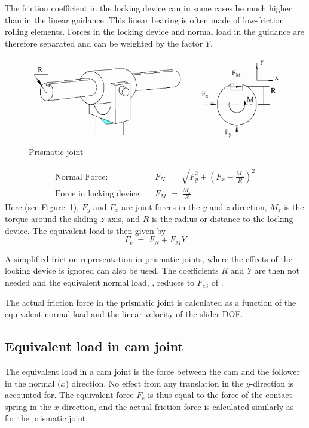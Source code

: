 The friction coefficient in the locking device can in some cases be much higher
than in the linear guidance. This linear bearing is often made of low-friction
rolling elements. Forces in the locking device and normal load in the guidance
are therefore separated and can be weighted by the factor $Y$.
%
\begin{figure}[b]
\includegraphics[width=\textwidth]{Figures/FricPriJoint.png}
\caption{Prismatic joint}
\label{figFRIC:Prism}
\end{figure}
%
\begin{eqnarray}
\text{Normal Force:} && F_N \;=\; \sqrt{F_y^2 + (F_x - \frac{M_z}{R})^2} \\
\text{Force in locking device:} && F_M \;=\; \frac{M_z}{R}
\end{eqnarray}
%
Here (see Figure~\ref{figFRIC:Prism}),
$F_y$ and $F_x$ are joint forces in the $y$ and $z$ direction,
$M_z$ is the torque around the sliding $z$-axis, and
$R$ is the radius or distance to the locking device.
The equivalent load is then given by
%
\begin{equation}
\label{eq:PrismLoad}
F_e \;=\; F_N + F_M Y
\end{equation}

A simplified friction representation in prismatic joints, where the effects of
the locking device is ignored can also be used.
The coefficients $R$ and $Y$ are then not needed and the equivalent normal
load, , reduces to $F_{e3}$ of .

The actual friction force in the prismatic joint is calculated as a function
of the equivalent normal load and the linear velocity of the slider DOF.


\subsection{Equivalent load in cam joint}
\label{subs:FricCamJoint}

The equivalent load in a cam joint is the force between the cam and the follower
in the normal ($x$) direction.
No effect from any translation in the $y$-direction is accounted for.
The equivalent force $F_e$ is thus equal to the force of the contact spring
in the $x$-direction, and the actual friction force is calculated similarly
as for the prismatic joint.
